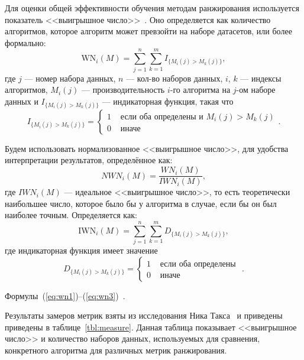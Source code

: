 Для оценки общей эффективности обучения методам ранжирования используется показатель <<выигрышное число>>~\cite{cmp}. Оно определяется как количество алгоритмов, которое алгоритм может превзойти на наборе датасетов, или более формально:
\begin{equation}
	\label{eq:wn1}
	\mathrm{WN}_i(M)=\sum_{j=1}^n \sum_{k=1}^m I_{\{M_i(j)>M_k(j)\}},
\end{equation}
где $j$ --- номер набора данных, $n$ --- кол-во наборов данных, $i$, $k$ --- индексы алгоритмов, $M_i(j)$ --- производительность $i$-го алгоритма на $j$-ом наборе данных и $I_{\{M_i(j)>M_k(j)\}}$ --- индикаторная функция, такая что
\[
I_{\{M_i(j)>M_k(j)\}}= \begin{cases}1 & \text { если оба определены и } M_i(j)>M_k(j) \\ 0 & \text { иначе }\end{cases}.
\]

Будем использовать нормализованное <<выигрышное число>>, для удобства интерпретации результатов, определённое как:
\begin{equation}
	\label{eq:wn2}
	NWN_i(M)=\frac{WN_i(M)}{IWN_i(M)},
\end{equation}
где $IWN_i(M)$ --- идеальное <<выигрышное число>>, то есть теоретически наибольшее число, которое было
бы у алгоритма в случае, если бы он был наиболее точным. Определяется как:
\begin{equation}
	\label{eq:wn3}
	\mathrm{IWN}_i(M)=\sum_{j=1}^n \sum_{k=1}^m D_{\{M_i(j)>M_k(j)\}},
\end{equation}
где индикаторная функция имеет значение
\[
D_{\{M_i(j)>M_k(j)\}}= \begin{cases}1 & \text { если оба определены } \\ 0 & \text { иначе }\end{cases}.
\]

Формулы~(\ref{eq:wn1})--(\ref{eq:wn3})~\cite{cmp}.

Результаты замеров метрик взяты из исследования Ника Такса~\cite{cmp} и приведены приведены в таблице~\ref{tbl:measure}. Данная таблица показывает <<выигрышное число>> и количество наборов данных, используемых для сравнения, конкретного алгоритма для различных метрик ранжирования.

